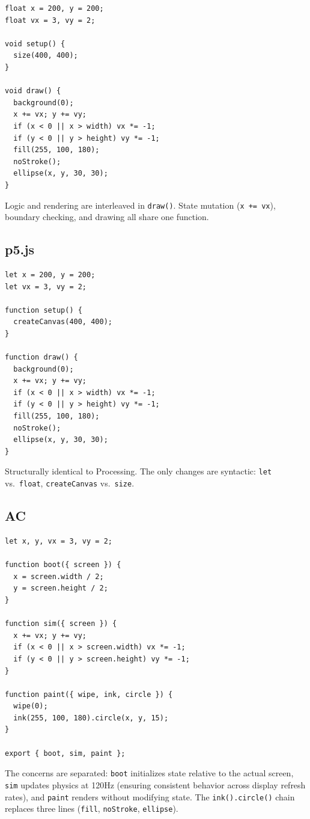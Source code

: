 \documentclass[10pt,letterpaper,twocolumn]{article}
\begin{document}
\begin{lstlisting}[style=processingstyle]
float x = 200, y = 200;
float vx = 3, vy = 2;

void setup() {
  size(400, 400);
}

void draw() {
  background(0);
  x += vx; y += vy;
  if (x < 0 || x > width) vx *= -1;
  if (y < 0 || y > height) vy *= -1;
  fill(255, 100, 180);
  noStroke();
  ellipse(x, y, 30, 30);
}
\end{lstlisting}

Logic and rendering are interleaved in \texttt{draw()}. State mutation (\texttt{x += vx}), boundary checking, and drawing all share one function.

\subsection{p5.js}

\begin{lstlisting}[style=p5style]
let x = 200, y = 200;
let vx = 3, vy = 2;

function setup() {
  createCanvas(400, 400);
}

function draw() {
  background(0);
  x += vx; y += vy;
  if (x < 0 || x > width) vx *= -1;
  if (y < 0 || y > height) vy *= -1;
  fill(255, 100, 180);
  noStroke();
  ellipse(x, y, 30, 30);
}
\end{lstlisting}

Structurally identical to Processing. The only changes are syntactic: \texttt{let} vs.\ \texttt{float}, \texttt{createCanvas} vs.\ \texttt{size}.

\subsection{AC}

\begin{lstlisting}[style=acjsstyle]
let x, y, vx = 3, vy = 2;

function boot({ screen }) {
  x = screen.width / 2;
  y = screen.height / 2;
}

function sim({ screen }) {
  x += vx; y += vy;
  if (x < 0 || x > screen.width) vx *= -1;
  if (y < 0 || y > screen.height) vy *= -1;
}

function paint({ wipe, ink, circle }) {
  wipe(0);
  ink(255, 100, 180).circle(x, y, 15);
}

export { boot, sim, paint };
\end{lstlisting}

The concerns are separated: \texttt{boot} initializes state relative to the actual screen, \texttt{sim} updates physics at 120Hz (ensuring consistent behavior across display refresh rates), and \texttt{paint} renders without modifying state. The \texttt{ink().circle()} chain replaces three lines (\texttt{fill}, \texttt{noStroke}, \texttt{ellipse}).
\end{document}
